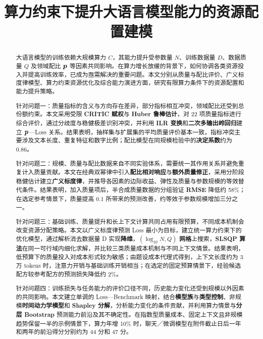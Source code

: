 \documentclass[bwprint]{gmcmthesis}
\title{算力约束下提升大语言模型能力的资源配置建模}   %
\numberwithin{equation}{section}
\numberwithin{figure}{section}
\numberwithin{table}{section}
\begin{document}
\maketitle


\begin{abstract}    %
    大语言模型的训练依赖大规模算力 $C$，其能力提升受参数量 $N$、训练数据量 $D$、数据质量 $Q$ 及领域配比 $\textit{\textbf{p}}$ 等因素共同影响。在算力增长放缓的背景下，如何协调各类资源投入并提高训练效率，已成为亟需解决的重要问题。本文分别从质量与配比评价、广义标度律模型、算力约束资源优化及综合能力演进方面，研究有限算力条件下的资源配置和能力提升策略。
    
    针对问题一：质量指标的含义与方向存在差异，部分指标相互冲突，领域配比还受到总份额约束。本文采用受限 \textbf{CRITIC 赋权}与 \textbf{Huber 鲁棒估计}，对 22 项质量指标进行综合评价，通过分歧度与稳健极差识别冲突，并利用 \textbf{ILR 变换}和\textbf{二次多输出岭回归}建立 $\textit{\textbf{p}}$—Loss 关系。结果表明，抽样集与扩展集的平均质量评价基本一致，指标冲突主要涉及文本长度、重复特征和数字比例；配比模型在同规模检验中的\textbf{决定系数}约为 0.86。
    
    针对问题二：规模、质量与配比数据来自不同实验体系，需要统一其作用关系并避免重复计入质量贡献。本文在经典双幂律中引入\textbf{配比相对响应}与\textbf{额外质量修正}，采用分阶段稳健估计建立\textbf{广义标度律}，并推导各因素的边际收益、弹性及质量与参数规模的等效替代条件。结果表明，加入质量项后，半合成质量数据的分组验证 \textbf{RMSE} 降低约 58\%；在选定参考情景下，质量提高 0.1 所带来的预测改善，约等效于参数规模增加三分之一。
    
    针对问题三：基础训练、质量提升和长上下文计算共同占用有限预算，不同成本机制会改变资源分配策略。本文以广义标度律预测 Loss 最小为目标，建立统一算力约束下的优化模型，通过解析消去数据量 D 实现\textbf{降维}，\textbf{$(\log_{10}N, Q)$ 网格}上搜索，\textbf{SLSQP 算法}在同一可行域内细化求解，并比较三类质量成本机制与不同上下文情景。结果表明，低预算下的质量投入对成本形式较为敏感；由题设成本代理式得到，上下文长度约为 3 万 tokens 时，注意力开销与基础训练开销相当；在选定的固定预算情景下，经验候选配方较参考配方的预测损失降低约 2\%。
    
    针对问题四：训练损失与任务能力的评价口径不同，历史能力变化还受到规模以外因素的共同影响。本文建立单调的 Loss—Benchmark 映射，结合\textbf{模型族}与\textbf{类型控制}、非规模\textbf{时间动力学模型}和 \textbf{Shapley 分解}，分析能力变化的条件贡献，并利用算力情景与\textbf{分层 Bootstrap} 预测能力前沿及其不确定性。在指数型质量成本、固定上下文且非规模趋势保留一半的示例情景下，算力年增 10\% 时，聊天／微调模型在附件截止日后一年和两年的前沿得分分别约为 44 分和 47 分。

\end{abstract}
\end{document}
